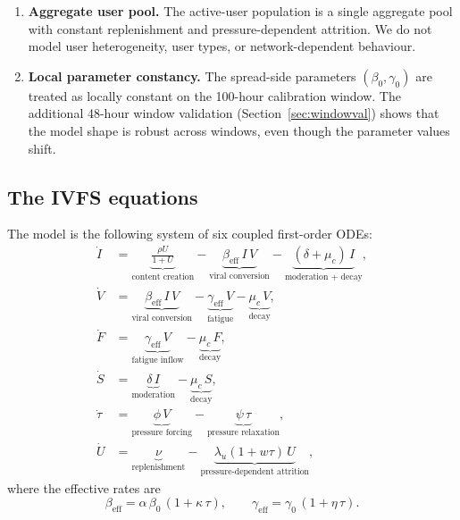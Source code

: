 \documentclass[11pt]{article}
\begin{document}
\begin{enumerate}[leftmargin=1.5em]
    \item \textbf{Aggregate user pool.} The active-user population is a single aggregate pool with constant replenishment and pressure-dependent attrition. We do not model user heterogeneity, user types, or network-dependent behaviour.

    \item \textbf{Local parameter constancy.} The spread-side parameters $(\beta_0, \gamma_0)$ are treated as locally constant on the 100-hour calibration window. The additional 48-hour window validation (Section~\ref{sec:windowval}) shows that the model shape is robust across windows, even though the parameter values shift.
\end{enumerate}

\subsection{The IVFS equations}
\label{sec:equations}

The model is the following system of six coupled first-order ODEs:
\begin{align}
\dot{I} &= \underbrace{\frac{\rho U}{1+U}}_{\text{content creation}} - \underbrace{\beta_{\mathrm{eff}}\, I\, V}_{\text{viral conversion}} - \underbrace{(\delta + \mu_c)\, I}_{\text{moderation + decay}}, \label{eq:I} \\[6pt]
\dot{V} &= \underbrace{\beta_{\mathrm{eff}}\, I\, V}_{\text{viral conversion}} - \underbrace{\gamma_{\mathrm{eff}}\, V}_{\text{fatigue}} - \underbrace{\mu_c\, V}_{\text{decay}}, \label{eq:V} \\[6pt]
\dot{F} &= \underbrace{\gamma_{\mathrm{eff}}\, V}_{\text{fatigue inflow}} - \underbrace{\mu_c\, F}_{\text{decay}}, \label{eq:F} \\[6pt]
\dot{S} &= \underbrace{\delta\, I}_{\text{moderation}} - \underbrace{\mu_c\, S}_{\text{decay}}, \label{eq:S} \\[6pt]
\dot{\tau} &= \underbrace{\phi\, V}_{\text{pressure forcing}} - \underbrace{\psi\, \tau}_{\text{pressure relaxation}}, \label{eq:tau} \\[6pt]
\dot{U} &= \underbrace{\nu}_{\text{replenishment}} - \underbrace{\lambda_u (1 + w\tau)\, U}_{\text{pressure-dependent attrition}}, \label{eq:U}
\end{align}
where the effective rates are
\begin{equation}
\beta_{\mathrm{eff}} = \alpha\, \beta_0\, (1 + \kappa\, \tau), \qquad
\gamma_{\mathrm{eff}} = \gamma_0\, (1 + \eta\, \tau).
\label{eq:eff_rates}
\end{equation}
\end{document}
